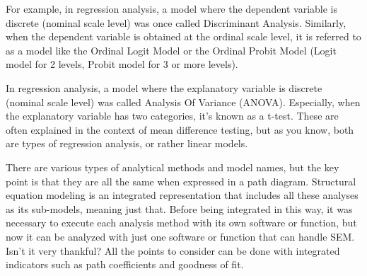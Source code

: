 \documentclass{ltjsbook}
\begin{document}
For example, in regression analysis, a model where the dependent variable is discrete (nominal scale level) was once called Discriminant Analysis. Similarly, when the dependent variable is obtained at the ordinal scale level, it is referred to as a model like the Ordinal Logit Model or the Ordinal Probit Model (Logit model for 2 levels, Probit model for 3 or more levels).

In regression analysis, a model where the explanatory variable is discrete (nominal scale level) was called Analysis Of Variance (ANOVA). Especially, when the explanatory variable has two categories, it's known as a t-test. These are often explained in the context of mean difference testing, but as you know, both are types of regression analysis, or rather linear models.

There are various types of analytical methods and model names, but the key point is that they are all the same when expressed in a path diagram. Structural equation modeling is an integrated representation that includes all these analyses as its sub-models, meaning just that. Before being integrated in this way, it was necessary to execute each analysis method with its own software or function, but now it can be analyzed with just one software or function that can handle SEM. Isn't it very thankful? All the points to consider can be done with integrated indicators such as path coefficients and goodness of fit.
\end{document}
